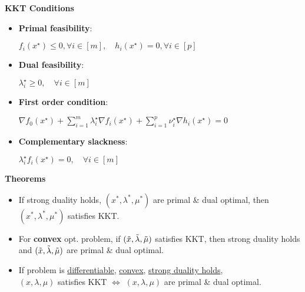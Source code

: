 {\LARGE \textbf{KKT Conditions}}

\begin{itemize}

\item \textbf{Primal feasibility}:

$
f_{i}\left(x^{\star}\right) \leq 0, \forall i \in [m], \quad h_{i}\left(x^{\star}\right)=0, \forall i \in [p]
$

\item \textbf{Dual feasibility}:

$\lambda_{i}^{\star} \geq 0,  \quad \forall i \in [m]$

\item \textbf{First order condition}:

$
\nabla f_{0}\left(x^{\star}\right)+\sum_{i=1}^{m} \lambda_{i}^{\star} \nabla f_{i}\left(x^{\star}\right)+\sum_{i=1}^{p} \nu_{i}^{\star} \nabla h_{i}\left(x^{\star}\right)=0
$

\item \textbf{Complementary slackness}:

$\lambda_{i}^{\star} f_{i}\left(x^{\star}\right)=0, \quad \forall i \in [m]$

\end{itemize}

\textbf{Theorems}

\begin{itemize}
    \item If strong duality holds, $(x^*,\lambda^*,\mu^*)$ are primal \& dual optimal, then $(x^*,\lambda^*,\mu^*)$ satisfies KKT.
    \item For \textbf{convex} opt. problem, if $(\Tilde{x},\Tilde{\lambda},\Tilde{\mu})$ satisfies KKT, then strong duality holds and $(\Tilde{x},\Tilde{\lambda},\Tilde{\mu})$ are primal \& dual optimal.  
    \item If problem is \underline{differentiable}, \underline{convex}, \underline{strong duality holds}, \\ 
    $(x,\lambda,\mu)$ satisfies KKT $\Longleftrightarrow$ $(x,\lambda,\mu)$ are primal \& dual optimal. 
\end{itemize}



